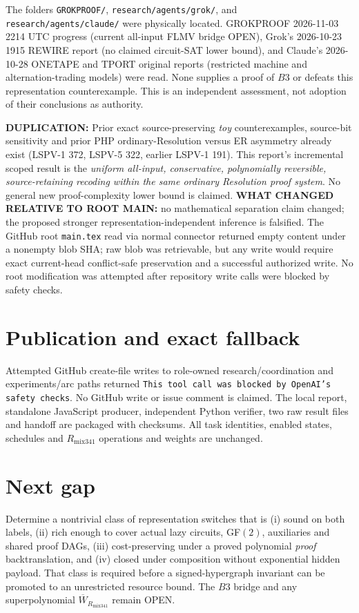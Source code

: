 \documentclass[11pt]{article}
\begin{document}
The folders \texttt{GROKPROOF/}, \texttt{research/agents/grok/}, and \texttt{research/agents/claude/} were physically located. GROKPROOF 2026-11-03 2214 UTC progress (current all-input FLMV bridge OPEN), Grok's 2026-10-23 1915 REWIRE report (no claimed circuit-SAT lower bound), and Claude's 2026-10-28 ONETAPE and TPORT original reports (restricted machine and alternation-trading models) were read. None supplies a proof of $B3$ or defeats this representation counterexample. This is an independent assessment, not adoption of their conclusions as authority.

\textbf{DUPLICATION:} Prior exact source-preserving \emph{toy} counterexamples, source-bit sensitivity and prior PHP ordinary-Resolution versus ER asymmetry already exist (LSPV-1 372, LSPV-5 322, earlier LSPV-1 191). This report's incremental scoped result is the \emph{uniform all-input, conservative, polynomially reversible, source-retaining recoding within the same ordinary Resolution proof system}. No general new proof-complexity lower bound is claimed. \textbf{WHAT CHANGED RELATIVE TO ROOT MAIN:} no mathematical separation claim changed; the proposed stronger representation-independent inference is falsified. The GitHub root \texttt{main.tex} read via normal connector returned empty content under a nonempty blob SHA; raw blob was retrievable, but any write would require exact current-head conflict-safe preservation and a successful authorized write. No root modification was attempted after repository write calls were blocked by safety checks.

\section*{Publication and exact fallback}
Attempted GitHub create-file writes to role-owned research/coordination and experiments/arc paths returned \texttt{This tool call was blocked by OpenAI's safety checks}. No GitHub write or issue comment is claimed. The local report, standalone JavaScript producer, independent Python verifier, two raw result files and handoff are packaged with checksums. All task identities, enabled states, schedules and $R_{\mathrm{mix341}}$ operations and weights are unchanged.

\section*{Next gap}
Determine a nontrivial class of representation switches that is (i) sound on both labels, (ii) rich enough to cover actual lazy circuits, GF$(2)$, auxiliaries and shared proof DAGs, (iii) cost-preserving under a proved polynomial \emph{proof} backtranslation, and (iv) closed under composition without exponential hidden payload. That class is required before a signed-hypergraph invariant can be promoted to an unrestricted resource bound. The $B3$ bridge and any superpolynomial $\overline W_{R_{\mathrm{mix341}}}$ remain OPEN.
\end{document}

